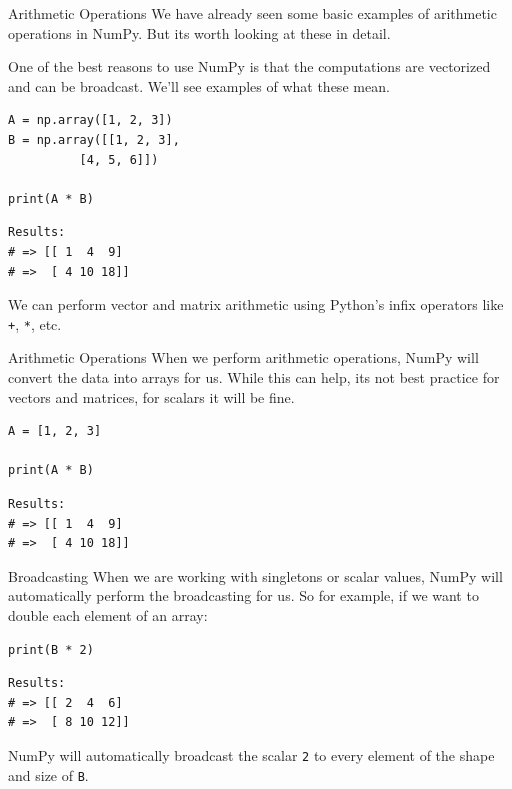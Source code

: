 \documentclass[10pt]{beamer}
\begin{document}
\begin{frame}[label={sec:org218bf7e},fragile]{Arithmetic Operations}
 We have already seen some basic examples of arithmetic operations in NumPy. But its
worth looking at these in detail.

One of the best reasons to use NumPy is that the computations are \alert{vectorized} and can
be \alert{broadcast}. We'll see examples of what these mean.

\begin{verbatim}
A = np.array([1, 2, 3])
B = np.array([[1, 2, 3],
	      [4, 5, 6]])

print(A * B)
\end{verbatim}

\begin{verbatim}
Results: 
# => [[ 1  4  9]
# =>  [ 4 10 18]]
\end{verbatim}


We can perform vector and matrix arithmetic using Python's infix operators like \texttt{+}, \texttt{*},
etc.
\end{frame}

\begin{frame}[label={sec:org28f938e},fragile]{Arithmetic Operations}
 When we perform arithmetic operations, NumPy will convert the data into arrays for
us. While this can help, its not best practice for vectors and matrices, for scalars
it will be fine.

\begin{verbatim}
A = [1, 2, 3]

print(A * B)
\end{verbatim}

\begin{verbatim}
Results: 
# => [[ 1  4  9]
# =>  [ 4 10 18]]
\end{verbatim}
\end{frame}

\begin{frame}[label={sec:orgd3dfa0a},fragile]{Broadcasting}
 When we are working with singletons or scalar values, NumPy will automatically
perform the broadcasting for us. So for example, if we want to double each element of
an array:

\begin{verbatim}
print(B * 2)
\end{verbatim}

\begin{verbatim}
Results: 
# => [[ 2  4  6]
# =>  [ 8 10 12]]
\end{verbatim}


NumPy will automatically broadcast the scalar \texttt{2} to every element of the shape and
size of \texttt{B}.
\end{frame}
\end{document}
